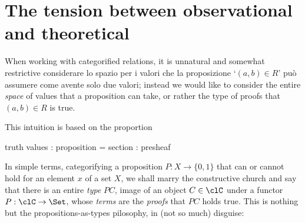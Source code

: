 \documentclass[a4paper]{../birkjour}
\begin{document}
\section{The tension between observational and theoretical}
\label{sec:orge11c3c4}
When working with categorified relations, it is unnatural and somewhat restrictive considerare lo spazio per i valori che la proposizione `$(a,b)\in R$' può assumere come avente solo due valori; instead we would like to consider the entire \emph{space} of values that a proposition can take, or rather the type of proofs that $(a,b)\in R$ is true.

This intuition is based on the proportion
\begin{center}
  truth values : proposition = section : presheaf
\end{center}
In simple terms, categorifying a proposition $P : X\to \{0,1\}$ that can or cannot hold for an element $x$ of a set $X$, we shall marry the constructive church and say that there is an entire \emph{type} $PC$, image of an object $C\in\clC$ under a functor $P : \clC \to \Set$, whose \emph{terms} are the \emph{proofs} that $PC$ holds true. This is nothing but the propositions-as-types pilosophy, in (not so much) disguise: \cite{a,b,c}
\end{document}

